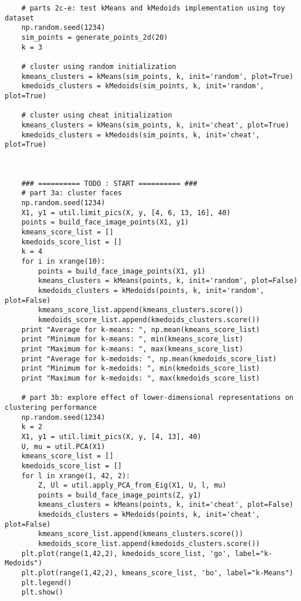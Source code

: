 \documentclass[11pt]{article}
\begin{document}
\begin{verbatim}
    # parts 2c-e: test kMeans and kMedoids implementation using toy dataset
    np.random.seed(1234)
    sim_points = generate_points_2d(20)
    k = 3
    
    # cluster using random initialization
    kmeans_clusters = kMeans(sim_points, k, init='random', plot=True)
    kmedoids_clusters = kMedoids(sim_points, k, init='random', plot=True)
    
    # cluster using cheat initialization
    kmeans_clusters = kMeans(sim_points, k, init='cheat', plot=True)
    kmedoids_clusters = kMedoids(sim_points, k, init='cheat', plot=True)    
    
    
    
    ### ========== TODO : START ========== ###    
    # part 3a: cluster faces
    np.random.seed(1234)
    X1, y1 = util.limit_pics(X, y, [4, 6, 13, 16], 40)
    points = build_face_image_points(X1, y1)
    kmeans_score_list = []
    kmedoids_score_list = []
    k = 4
    for i in xrange(10):
        points = build_face_image_points(X1, y1)
        kmeans_clusters = kMeans(points, k, init='random', plot=False)
        kmedoids_clusters = kMedoids(points, k, init='random', plot=False) 
        kmeans_score_list.append(kmeans_clusters.score())
        kmedoids_score_list.append(kmedoids_clusters.score())
    print "Average for k-means: ", np.mean(kmeans_score_list)
    print "Minimum for k-means: ", min(kmeans_score_list)
    print "Maximum for k-means: ", max(kmeans_score_list)
    print "Average for k-medoids: ", np.mean(kmedoids_score_list)
    print "Minimum for k-medoids: ", min(kmedoids_score_list)
    print "Maximum for k-medoids: ", max(kmedoids_score_list)

    # part 3b: explore effect of lower-dimensional representations on clustering performance
    np.random.seed(1234)
    k = 2
    X1, y1 = util.limit_pics(X, y, [4, 13], 40)
    U, mu = util.PCA(X1)
    kmeans_score_list = []
    kmedoids_score_list = []
    for l in xrange(1, 42, 2):
        Z, Ul = util.apply_PCA_from_Eig(X1, U, l, mu)
        points = build_face_image_points(Z, y1)
        kmeans_clusters = kMeans(points, k, init='cheat', plot=False)
        kmedoids_clusters = kMedoids(points, k, init='cheat', plot=False) 
        kmeans_score_list.append(kmeans_clusters.score())
        kmedoids_score_list.append(kmedoids_clusters.score())
    plt.plot(range(1,42,2), kmedoids_score_list, 'go', label="k-Medoids")
    plt.plot(range(1,42,2), kmeans_score_list, 'bo', label="k-Means")
    plt.legend()
    plt.show()


\end{verbatim}
\end{document}
